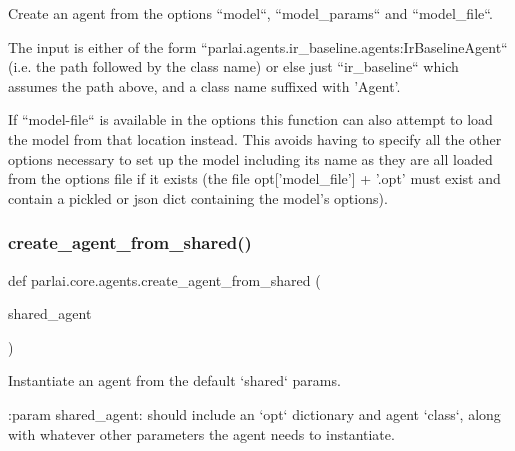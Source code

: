 \begin{DoxyVerb}Create an agent from the options ``model``, ``model_params`` and ``model_file``.

The input is either of the form
``parlai.agents.ir_baseline.agents:IrBaselineAgent`` (i.e. the path
followed by the class name) or else just ``ir_baseline`` which
assumes the path above, and a class name suffixed with 'Agent'.

If ``model-file`` is available in the options this function can also
attempt to load the model from that location instead. This avoids having to
specify all the other options necessary to set up the model including its
name as they are all loaded from the options file if it exists (the file
opt['model_file'] + '.opt' must exist and contain a pickled or json dict
containing the model's options).
\end{DoxyVerb}
 \mbox{\label{namespaceparlai_1_1core_1_1agents_aa5af5dd1d2f9da491b60348d479b849f}} 
\subsubsection{\texorpdfstring{create\+\_\+agent\+\_\+from\+\_\+shared()}{create\_agent\_from\_shared()}}
{\footnotesize\ttfamily def parlai.\+core.\+agents.\+create\+\_\+agent\+\_\+from\+\_\+shared (\begin{DoxyParamCaption}\item[{}]{shared\+\_\+agent }\end{DoxyParamCaption})}

\begin{DoxyVerb}Instantiate an agent from the default `shared` params.

:param shared_agent:
    should include an `opt` dictionary and agent `class`, along with
    whatever other parameters the agent needs to instantiate.
\end{DoxyVerb}
 \mbox{\label{namespaceparlai_1_1core_1_1agents_a5600530545f5e60a79e2d657b5af1d8c}} 
